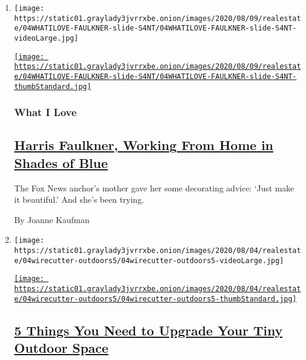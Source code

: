 \begin{enumerate}
\def\labelenumi{\arabic{enumi}.}
\item
  \texttt{[image: https://static01.graylady3jvrrxbe.onion/images/2020/08/09/realestate/04WHATILOVE-FAULKNER-slide-S4NT/04WHATILOVE-FAULKNER-slide-S4NT-videoLarge.jpg]}

  \href{/2020/08/04/realestate/harris-faulkner-home-fox-news.html}{\texttt{[image: https://static01.graylady3jvrrxbe.onion/images/2020/08/09/realestate/04WHATILOVE-FAULKNER-slide-S4NT/04WHATILOVE-FAULKNER-slide-S4NT-thumbStandard.jpg]}}

  \hypertarget{what-i-love}{%
  \subsubsection{What I Love}\label{what-i-love}}

  \hypertarget{harris-faulkner-working-from-home-in-shades-of-blue}{%
  \subsection{\texorpdfstring{\href{/2020/08/04/realestate/harris-faulkner-home-fox-news.html}{Harris
  Faulkner, Working From Home in Shades of
  Blue}}{Harris Faulkner, Working From Home in Shades of Blue}}\label{harris-faulkner-working-from-home-in-shades-of-blue}}

  The Fox News anchor's mother gave her some decorating advice: `Just
  make it beautiful.' And she's been trying.

  By Joanne Kaufman
\item
  \texttt{[image: https://static01.graylady3jvrrxbe.onion/images/2020/08/04/realestate/04wirecutter-outdoors5/04wirecutter-outdoors5-videoLarge.jpg]}

  \href{/2020/08/04/realestate/upgrade-your-outdoor-space.html}{\texttt{[image: https://static01.graylady3jvrrxbe.onion/images/2020/08/04/realestate/04wirecutter-outdoors5/04wirecutter-outdoors5-thumbStandard.jpg]}}

  \hypertarget{5-things-you-need-to-upgrade-your-tiny-outdoor-space}{%
  \subsection{\texorpdfstring{\href{/2020/08/04/realestate/upgrade-your-outdoor-space.html}{5
  Things You Need to Upgrade Your Tiny Outdoor
  Space}}{5 Things You Need to Upgrade Your Tiny Outdoor Space}}\label{5-things-you-need-to-upgrade-your-tiny-outdoor-space}}


\end{enumerate}
